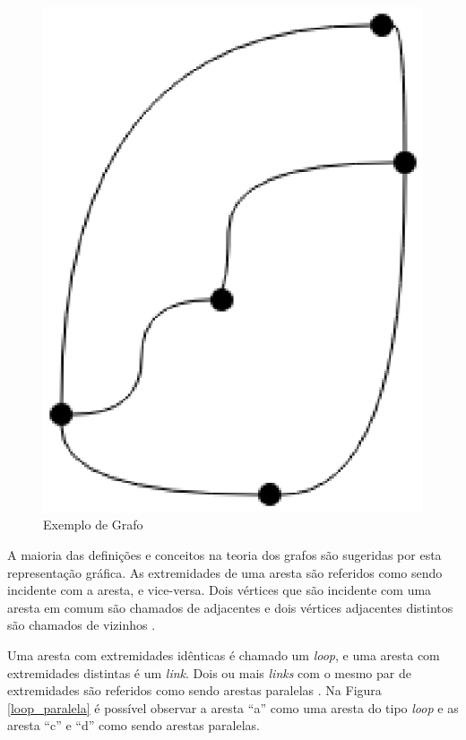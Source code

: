 \begin{figure}[!h]
	\centering
	\includegraphics[scale=0.5]{figuras/capitulo1/exemplo_grafo.eps}
	\caption{Exemplo de Grafo}
	\label{exemplo_grafo}
\end{figure}

A maioria das definições e conceitos na teoria dos grafos são sugeridas por esta representação gráfica. As extremidades de uma aresta são referidos como sendo incidente com a aresta, e vice-versa. Dois vértices que são incidente com uma aresta em comum são chamados de adjacentes e dois vértices adjacentes distintos são chamados de vizinhos \cite{Costa:2011}.

Uma aresta com extremidades idênticas é chamado um \textit{loop}, e uma aresta com extremidades distintas é um \textit{link}. Dois ou mais \textit{links} com o mesmo par de extremidades são referidos como sendo arestas paralelas \cite{Bondy:2007}. Na Figura \ref{loop_paralela} é possível observar a aresta ``a'' como uma aresta do tipo \textit{loop} e as aresta ``c'' e ``d'' como sendo arestas paralelas.

